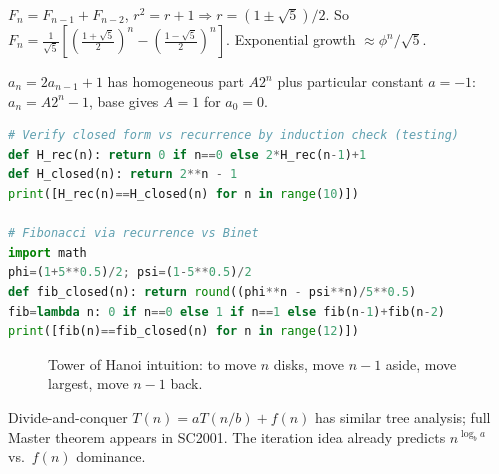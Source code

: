 \begin{example}
$F_n=F_{n-1}+F_{n-2}$, $r^2=r+1\Rightarrow r=(1\pm\sqrt5)/2$. So $F_n=\frac{1}{\sqrt5}\left[\left(\frac{1+\sqrt5}2\right)^n-\left(\frac{1-\sqrt5}2\right)^n\right]$. Exponential growth $\approx\phi^n/\sqrt5$.
\end{example}

\begin{example}
$a_n=2a_{n-1}+1$ has homogeneous part $A2^n$ plus particular constant $a=-1$: $a_n=A2^n-1$, base gives $A=1$ for $a_0=0$.
\end{example}

\begin{lstlisting}[language=Python]
# Verify closed form vs recurrence by induction check (testing)
def H_rec(n): return 0 if n==0 else 2*H_rec(n-1)+1
def H_closed(n): return 2**n - 1
print([H_rec(n)==H_closed(n) for n in range(10)])

# Fibonacci via recurrence vs Binet
import math
phi=(1+5**0.5)/2; psi=(1-5**0.5)/2
def fib_closed(n): return round((phi**n - psi**n)/5**0.5)
fib=lambda n: 0 if n==0 else 1 if n==1 else fib(n-1)+fib(n-2)
print([fib(n)==fib_closed(n) for n in range(12)])
\end{lstlisting}

\begin{figure}[h]\centering
{}
\caption{Tower of Hanoi intuition: to move $n$ disks, move $n-1$ aside, move largest, move $n-1$ back.}
\label{fig:hanoi}
\end{figure}

\begin{remark}
Divide-and-conquer $T(n)=aT(n/b)+f(n)$ has similar tree analysis; full Master theorem appears in SC2001. The iteration idea already predicts $n^{\log_b a}$ vs.\ $f(n)$ dominance.
\end{remark}


